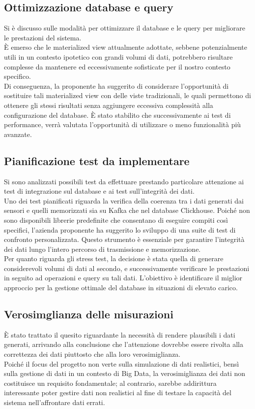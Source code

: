 \documentclass{article}
\begin{document}
    \subsection{Ottimizzazione database e query}
    Si è discusso sulle modalità per ottimizzare il database e le query per migliorare le prestazioni del sistema. \\
    È emerso che le materialized view attualmente adottate, sebbene potenzialmente utili in un contesto ipotetico con grandi volumi di dati, potrebbero risultare complesse da mantenere ed eccessivamente sofisticate per il nostro contesto specifico. \\
    Di conseguenza, la proponente ha suggerito di considerare l'opportunità di sostituire tali materialized view con delle viste tradizionali, le quali permettono di ottenere gli stessi risultati senza aggiungere eccessiva complessità alla configurazione del database. È stato stabilito che successivamente ai test di performance, verrà valutata l'opportunità di utilizzare o meno funzionalità più avanzate. \\
    \subsection{Pianificazione test da implementare}
    Si sono analizzati possibili test da effettuare prestando particolare attenzione ai test di integrazione sul database e ai test sull'integrità dei dati. \\
    Uno dei test pianificati riguarda la verifica della coerenza tra i dati generati dai sensori e quelli memorizzati sia su Kafka che nel database Clickhouse. Poiché non sono disponibili librerie predefinite che consentano di eseguire compiti così specifici, l'azienda proponente ha suggerito lo sviluppo di una suite di test di confronto personalizzata. Questo strumento è essenziale per garantire l'integrità dei dati lungo l'intero percorso di trasmissione e memorizzazione.\\
    Per quanto riguarda gli stress test, la decisione è stata quella di generare considerevoli volumi di dati al secondo, e successivamente verificare le prestazioni in seguito ad operazioni e query su tali dati. L'obiettivo è identificare il miglior approccio per la gestione ottimale del database in situazioni di elevato carico. 
    \subsection{Verosimglianza delle misurazioni}
    È stato trattato il quesito riguardante la necessità di rendere plausibili i dati generati, arrivando alla conclusione che l'attenzione dovrebbe essere rivolta alla correttezza dei dati piuttosto che alla loro verosimiglianza.\\
    Poiché il focus del progetto non verte sulla simulazione di dati realistici, bensì sulla gestione di dati in un contesto di Big Data, la verosimiglianza dei dati non costituisce un requisito fondamentale; al contrario, sarebbe addirittura interessante poter gestire dati non realistici al fine di testare la capacità del sistema nell'affrontare dati errati.
\end{document}
